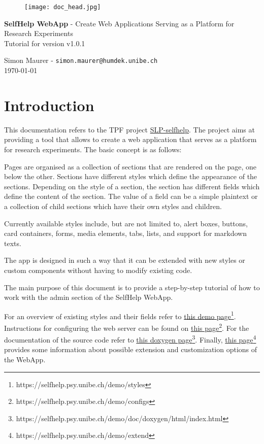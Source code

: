 \documentclass[a4paper,oneside]{book}
\begin{document}
\begin{figure}[h]
  \texttt{[image: doc\_head.jpg]}
\end{figure}

\parindent=0pt
\parskip=0.25cm

\begin{center}
\fontsize{20}{21}\selectfont

\textbf{SelfHelp WebApp} - Create Web Applications Serving as a Platform for Research Experiments\\
\vskip 6mm
Tutorial for version v1.0.1
\vskip 6mm

\fontsize{13}{14}\selectfont
Simon Maurer - \texttt{simon.maurer@humdek.unibe.ch}\\
\today
\end{center}

\tableofcontents

\chapter{Introduction}\label{sec.intro}

This documentation refers to the TPF project \href{http://phhum-a209-cp.unibe.ch:10012/SLP/SLP-sleep_coach}{SLP-selfhelp}.
The project aims at providing a tool that allows to create a web application that serves as a platform for research experiments.
The basic concept is as follows:

Pages are organised as a collection of sections that are rendered on the page, one below the other.
Sections have different styles which define the appearance of the sections.
Depending on the style of a section, the section has different fields which define the content of the section.
The value of a field can be a simple plaintext or a collection of child sections which have their own styles and children.

Currently available styles include, but are not limited to, alert boxes, buttons, card containers, forms, media elements, tabs, lists, and support for markdown texts.

The app is designed in such a way that it can be extended with new styles or custom components without having to modify existing code.

The main purpose of this document is to provide a step-by-step tutorial of how to work with the admin section of the SelfHelp WebApp.

For an overview of existing styles and their fields refer to \href{https://selfhelp.psy.unibe.ch/demo/styles}{this demo page}\footnote{https://selfhelp.psy.unibe.ch/demo/styles}.
Instructions for configuring the web server can be found on \href{https://selfhelp.psy.unibe.ch/demo/configs}{this page}\footnote{https://selfhelp.psy.unibe.ch/demo/configs}.
For the documentation of the source code refer to \href{https://selfhelp.psy.unibe.ch/demo/doc/doxygen/html/index.html}{this doxygen page}\footnote{https://selfhelp.psy.unibe.ch/demo/doc/doxygen/html/index.html}.
Finally, \href{https://selfhelp.psy.unibe.ch/demo/extend}{this page}\footnote{https://selfhelp.psy.unibe.ch/demo/extend} provides some information about possible extension and customization options of the WebApp.
\end{document}
